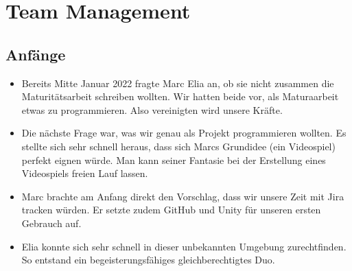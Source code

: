 \chapter{Team Management}

\section{Anfänge}
\begin{itemize}
    \item Bereits Mitte Januar 2022 fragte Marc Elia an, ob sie nicht zusammen die Maturitätsarbeit schreiben wollten. Wir hatten beide vor, als Maturaarbeit etwas zu programmieren. Also vereinigten wird unsere Kräfte.
    \item Die nächste Frage war, was wir genau als Projekt programmieren wollten. Es stellte sich sehr schnell heraus, dass sich Marcs Grundidee (ein Videospiel) perfekt eignen würde. Man kann seiner Fantasie bei der Erstellung eines Videospiels
    freien Lauf lassen.
    \item Marc brachte am Anfang direkt den Vorschlag, dass wir unsere Zeit mit Jira tracken würden. Er setzte zudem GitHub und Unity für unseren ersten Gebrauch auf. 
    \item Elia konnte sich sehr schnell in dieser unbekannten Umgebung zurechtfinden. So entstand ein begeisterungsfähiges gleichberechtigtes Duo.
\end{itemize}

